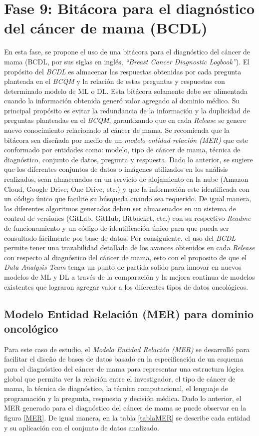 \section{Fase 9: Bitácora para el diagnóstico del cáncer de mama (BCDL) }
En esta fase, se propone el uso de una bitácora para el diagnóstico del cáncer de mama (BCDL, por sus siglas en inglés, \textit{“Breast Cancer Diagnostic Logbook”}). El propósito del \textit{BCDL} es almacenar las respuestas obtenidas por cada pregunta planteada en el \textit{BCQM} y la relación de estas preguntas y respuestas con determinado modelo de ML o DL. Esta bitácora solamente debe ser alimentada cuando la información obtenida generó valor agregado al dominio médico. Su principal propósito es evitar la redundancia de la información y la duplicidad de preguntas planteadas en el \textit{BCQM}, garantizando que en cada \textit{Release} se genere nuevo conocimiento relacionado al cáncer de mama. Se recomienda que la bitácora sea diseñada por medio de un \textit{modelo entidad relación (MER)} que este conformado por entidades como: modelo, tipo de cáncer de mama, técnica de diagnóstico, conjunto de datos, pregunta y respuesta. Dado lo anterior, se sugiere que los diferentes conjuntos de datos o imágenes utilizados en los análisis realizados, sean almacenados en un servicio de alojamiento en la nube (Amazon Cloud, Google Drive, One Drive, etc.) y que la información este identificada con un código único que facilite su búsqueda cuando sea requerido. De igual manera, los diferentes algoritmos generados deben ser almacenados en un sistema de control de versiones (GitLab, GitHub, Bitbucket, etc.) con su respectivo \textit{Readme} de funcionamiento y un código de identificación único para que pueda ser consultado fácilmente por base de datos. Por consiguiente, el uso del \textit{BCDL} permite tener una trazabilidad detallada de los avances obtenidos en cada \textit{Release} con respecto al diagnóstico del cáncer de mama, esto con el proposito de que el \textit{Data Analysis Team} tenga un punto de partida solido para innovar en nuevos modelos de ML y DL a través de la comparación y la mejora continua de modelos existentes que lograron agregar valor a los diferentes tipos de datos oncológicos.

\subsection{Modelo Entidad Relación (MER) para dominio oncológico}

Para este caso de estudio, el \textit{Modelo Entidad Relación (MER)} se desarrolló para facilitar el diseño de bases de datos basado en la especificación de un esquema para el diagnóstico del cáncer de mama para representar una estructura lógica global que permita ver la relación entre el investigador, el tipo de cáncer de mama, la técnica de diagnóstico, la técnica computacional, el lenguaje de programación  y la pregunta, respuesta y decisión médica. Dado lo anterior, el MER generado para el diagnóstico del cáncer de mama se puede observar en la figura \ref{MER}. De igual manera, en la tabla \ref{tablaMER} se describe cada entidad y su aplicación con el conjunto de datos analizado. 

